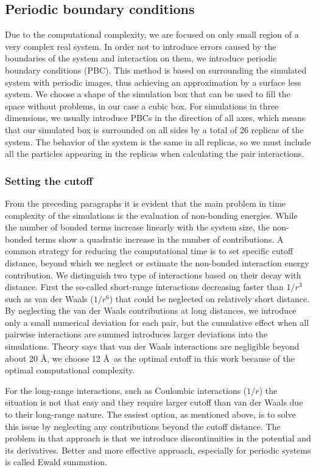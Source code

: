 \subsection{Periodic boundary conditions}
Due to the computational complexity, we are focused on only small region of a very complex real system.  In order not to introduce errors caused by the boundaries of the system and interaction on them, we introduce periodic boundary conditions (PBC). This method is based on surrounding the simulated system with periodic images, thus achieving an approximation by a surface less system. We choose a shape of the simulation box that can be used to fill the space without problems, in our case a cubic box. For simulations in three dimensions, we usually introduce PBCs in the direction of all axes, which means that our simulated box is surrounded on all sides by a total of 26 replicas of the system. The behavior of the system is the same in all replicas, so we must include all the particles appearing in the replicas when calculating the pair interactions. 

\subsubsection{Setting the cutoff}
From the preceding paragraphs it is evident that the main problem in time complexity of the simulations is the evaluation of non-bonding energies. While the number of bonded terms increase linearly with the system size, the non-bonded terms show a quadratic increase in the number of contributions. A common strategy for reducing the computational time is to set specific cutoff distance, beyond which we neglect or estimate the non-bonded interaction energy contribution. We distinguish two type of interactions based on their decay with distance. First the so-called short-range interactions decreasing faster than $1/r^3$ such as van der Waals ($1/r^6$) that could be neglected on relatively short distance. By neglecting the van der Waals contributions at long distances, we introduce only a small numerical deviation for each pair, but the cumulative effect when all pairwise interactions are summed introduces larger deviations into the simulations. Theory says that van der Waals interactions are negligible beyond about 20 \AA, we choose 12 \AA~as the optimal cutoff in this work because of the optimal computational complexity. 

For the long-range interactions, such as Coulombic interactions ($1/r$) the situation is not that easy and they require larger cutoff than van der Waals due to their long-range nature. The easiest option, as mentioned above, is to solve this issue by neglecting any contributions beyond the cutoff distance. The problem in that approach is that we introduce discontinuities in the potential and its derivatives. Better and more effective approach, especially for periodic systems is called Ewald summation.


